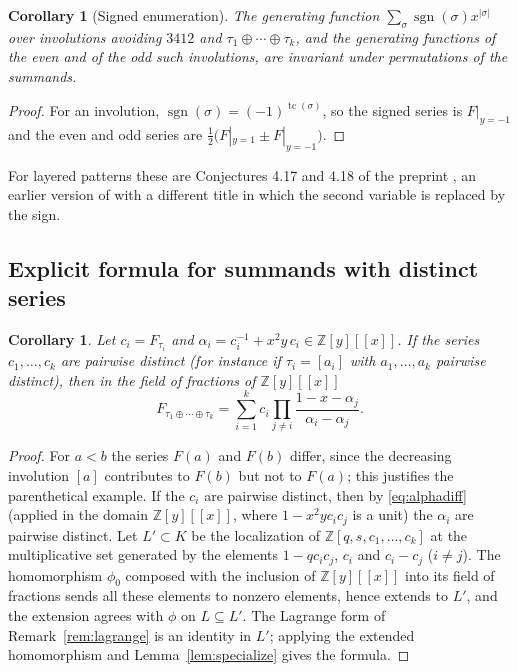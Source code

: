 \documentclass[11pt]{amsart}
\newtheorem{corollary}[theorem]{Corollary}
\theoremstyle{definition}
\DeclareMathOperator{\tc}{tc}
\newcommand{\Z}{\mathbb{Z}}
\newcommand{\ds}{\oplus}
\begin{document}
\begin{corollary}[Signed enumeration]\label{cor:sign}
The generating function $\sum_\sigma\operatorname{sgn}(\sigma)x^{|\sigma|}$ over involutions avoiding $3412$ and $\tau_1\ds\cdots\ds\tau_k$, and the generating functions of the even and of the odd such involutions, are invariant under permutations of the summands.
\end{corollary}
\begin{proof}
For an involution, $\operatorname{sgn}(\sigma)=(-1)^{\tc(\sigma)}$, so the signed series is $F|_{y=-1}$ and the even and odd series are $\tfrac12\bigl(F|_{y=1}\pm F|_{y=-1}\bigr)$.
\end{proof}
For layered patterns these are Conjectures 4.17 and 4.18 of the preprint \cite{EggeMansourArXiv2004}, an earlier version of \cite{EggeMansour2006} with a different title in which the second variable is replaced by the sign.

\subsection{Explicit formula for summands with distinct series}

\begin{corollary}\label{cor:explicit}
Let $c_i=F_{\tau_i}$ and $\alpha_i=c_i^{-1}+x^2y\,c_i\in\Z[y][[x]]$. If the series $c_1,\dots,c_k$ are pairwise distinct (for instance if $\tau_i=[a_i]$ with $a_1,\dots,a_k$ pairwise distinct), then in the field of fractions of $\Z[y][[x]]$
\[
F_{\tau_1\ds\cdots\ds\tau_k}=\sum_{i=1}^{k}c_i\prod_{j\ne i}\frac{1-x-\alpha_j}{\alpha_i-\alpha_j}.
\]
\end{corollary}
\begin{proof}
For $a<b$ the series $F(a)$ and $F(b)$ differ, since the decreasing involution $[a]$ contributes to $F(b)$ but not to $F(a)$; this justifies the parenthetical example. If the $c_i$ are pairwise distinct, then by \eqref{eq:alphadiff} (applied in the domain $\Z[y][[x]]$, where $1-x^2yc_ic_j$ is a unit) the $\alpha_i$ are pairwise distinct. Let $L'\subset K$ be the localization of $\Z[q,s,c_1,\dots,c_k]$ at the multiplicative set generated by the elements $1-qc_ic_j$, $c_i$ and $c_i-c_j$ ($i\ne j$). The homomorphism $\phi_0$ composed with the inclusion of $\Z[y][[x]]$ into its field of fractions sends all these elements to nonzero elements, hence extends to $L'$, and the extension agrees with $\phi$ on $L\subseteq L'$. The Lagrange form of Remark~\ref{rem:lagrange} is an identity in $L'$; applying the extended homomorphism and Lemma~\ref{lem:specialize} gives the formula.
\end{proof}
\end{document}
